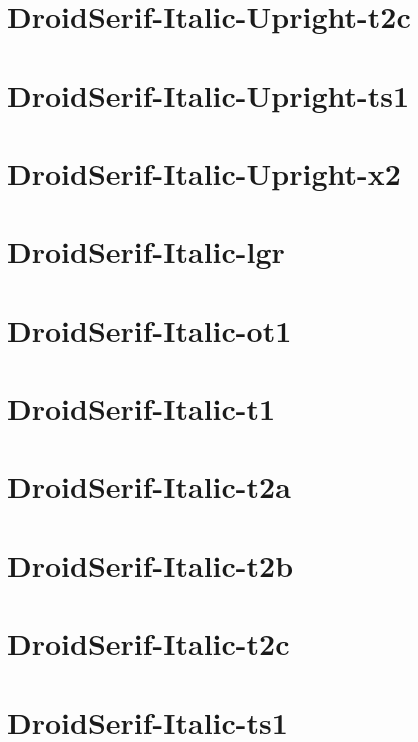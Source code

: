 \documentclass{article}
\begin{document}
\section{DroidSerif-Italic-Upright-t2c}

\section{DroidSerif-Italic-Upright-ts1}

\section{DroidSerif-Italic-Upright-x2}

\section{DroidSerif-Italic-lgr}

\section{DroidSerif-Italic-ot1}

\section{DroidSerif-Italic-t1}

\section{DroidSerif-Italic-t2a}

\section{DroidSerif-Italic-t2b}

\section{DroidSerif-Italic-t2c}

\section{DroidSerif-Italic-ts1}
\end{document}
